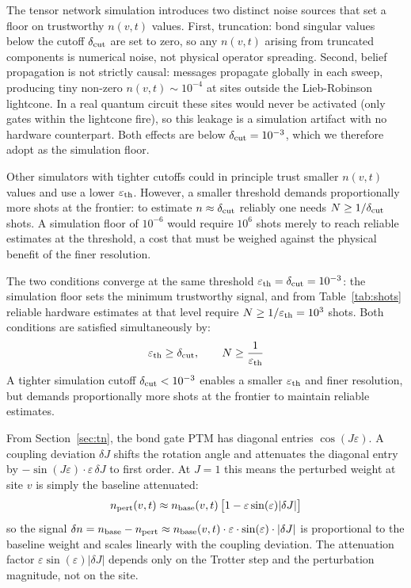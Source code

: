 \documentclass[11pt]{article}
\begin{document}
The tensor network simulation introduces two distinct noise sources that set a
floor on trustworthy $n(v,t)$ values. First, truncation: bond singular values
below the cutoff $\delta_{\rm cut}$ are set to zero, so any $n(v,t)$ arising
from truncated components is numerical noise, not physical operator spreading.
Second, belief propagation is not strictly causal: messages propagate globally
in each sweep, producing tiny non-zero $n(v,t) \sim 10^{-4}$ at sites outside
the Lieb-Robinson lightcone. In a real quantum circuit these sites would never
be activated (only gates within the lightcone fire), so this leakage is a
simulation artifact with no hardware counterpart. Both effects are below
$\delta_{\rm cut} = 10^{-3}$, which we therefore adopt as the simulation floor.

Other simulators with tighter cutoffs could in principle trust smaller $n(v,t)$
values and use a lower $\varepsilon_{\rm th}$. However, a smaller threshold
demands proportionally more shots at the frontier: to estimate $n \approx
\delta_{\rm cut}$ reliably one needs $N \geq 1/\delta_{\rm cut}$ shots.
A simulation floor of $10^{-6}$ would require $10^6$ shots merely to reach
reliable estimates at the threshold, a cost that must be weighed against
the physical benefit of the finer resolution.

The two conditions converge at the same threshold $\varepsilon_{\rm th} =
\delta_{\rm cut} = 10^{-3}$: the simulation floor sets the minimum trustworthy
signal, and from Table~\ref{tab:shots} reliable hardware estimates at that
level require $N \geq 1/\varepsilon_{\rm th} = 10^3$ shots. Both conditions
are satisfied simultaneously by:
\begin{equation}
    \varepsilon_{\rm th} \geq \delta_{\rm cut}, \qquad N \geq \frac{1}{\varepsilon_{\rm th}}
\end{equation}
A tighter simulation cutoff $\delta_{\rm cut} < 10^{-3}$ enables a smaller
$\varepsilon_{\rm th}$ and finer resolution, but demands proportionally more
shots at the frontier to maintain reliable estimates.

From Section~\ref{sec:tn}, the bond gate PTM has diagonal entries $\cos(J\varepsilon)$.
A coupling deviation $\delta J$ shifts the rotation angle and attenuates the diagonal
entry by $-\sin(J\varepsilon)\cdot\varepsilon\,\delta J$ to first order. At $J=1$
this means the perturbed weight at site $v$ is simply the baseline attenuated:
\begin{equation}
    n_{\rm pert}(v,t) \approx n_{\rm base}(v,t)\,\bigl[1 - \varepsilon\sin(\varepsilon)|\delta J|\bigr]
\end{equation}
so the signal $\delta n = n_{\rm base} - n_{\rm pert} \approx n_{\rm base}(v,t)
\cdot \varepsilon \cdot \sin(\varepsilon) \cdot |\delta J|$ is proportional to the
baseline weight and scales linearly with the coupling deviation. The attenuation
factor $\varepsilon\sin(\varepsilon)|\delta J|$ depends only on the Trotter step
and the perturbation magnitude, not on the site.
\end{document}
